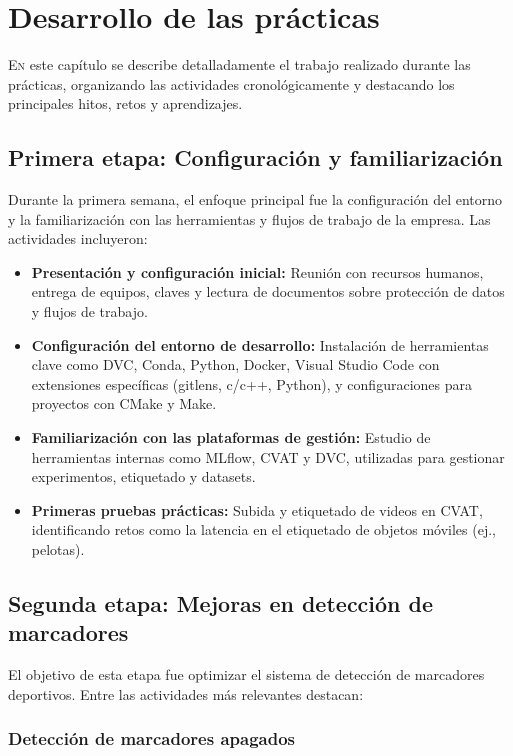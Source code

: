 \chapter{Desarrollo de las prácticas}
\label{chap:desarrollo}

\lettrine{E}{n} este capítulo se describe detalladamente el trabajo realizado durante las prácticas, organizando las actividades cronológicamente y destacando los principales hitos, retos y aprendizajes.

\section{Primera etapa: Configuración y familiarización}
\label{sec:primera_etapa}

Durante la primera semana, el enfoque principal fue la configuración del entorno y la familiarización con las herramientas y flujos de trabajo de la empresa. Las actividades incluyeron:

\begin{itemize}
    \item \textbf{Presentación y configuración inicial:} Reunión con recursos humanos, entrega de equipos, claves y lectura de documentos sobre protección de datos y flujos de trabajo.
    \item \textbf{Configuración del entorno de desarrollo:} Instalación de herramientas clave como DVC, Conda, Python, Docker, Visual Studio Code con extensiones específicas (gitlens, c/c++, Python), y configuraciones para proyectos con CMake y Make.
    \item \textbf{Familiarización con las plataformas de gestión:} Estudio de herramientas internas como MLflow, CVAT y DVC, utilizadas para gestionar experimentos, etiquetado y datasets.
    \item \textbf{Primeras pruebas prácticas:} Subida y etiquetado de videos en CVAT, identificando retos como la latencia en el etiquetado de objetos móviles (ej., pelotas).
\end{itemize}

\section{Segunda etapa: Mejoras en detección de marcadores}
\label{sec:segunda_etapa}

El objetivo de esta etapa fue optimizar el sistema de detección de marcadores deportivos. Entre las actividades más relevantes destacan:

\subsection{Detección de marcadores apagados}
\label{subsec:marcadores_apagados}

